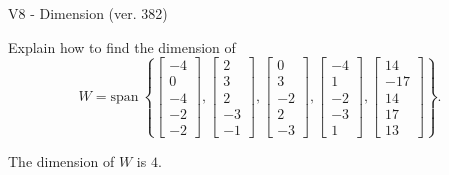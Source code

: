 \begin{exercise}
  \begin{exerciseTitle}V8 - Dimension (ver. 382)\end{exerciseTitle}
  \begin{exerciseStatement}
    Explain how to find the dimension of 
\[W=\mathrm{span}\ \left\{\left[\begin{array}{r}
-4 \\
0 \\
-4 \\
-2 \\
-2
\end{array}\right] , \left[\begin{array}{r}
2 \\
3 \\
2 \\
-3 \\
-1
\end{array}\right] , \left[\begin{array}{r}
0 \\
3 \\
-2 \\
2 \\
-3
\end{array}\right] , \left[\begin{array}{r}
-4 \\
1 \\
-2 \\
-3 \\
1
\end{array}\right] , \left[\begin{array}{r}
14 \\
-17 \\
14 \\
17 \\
13
\end{array}\right]\right\}.\]



  \end{exerciseStatement}
  \begin{exerciseAnswer}
   The dimension of \(W\) is  \(4\).
  


  \end{exerciseAnswer}
\end{exercise}